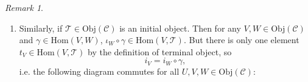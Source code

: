 \documentclass[11pt,openany]{book}
\theoremstyle{plain}
\theoremstyle{definition}
\theoremstyle{remark}
\newtheorem{remark}[remark]{Remark}
\begin{document}
\begin{remark}
\begin{enumerate}
    \item Similarly, if $\mathcal{T} \in \mathrm{Obj}(\mathcal{C})$ is an initial object. Then for any $V, W \in \mathrm{Obj}(\mathcal{C})$ and $\gamma \in \mathrm{Hom}(V,W)$, $\iota_W \circ \gamma \in \mathrm{Hom}(V,\mathcal{T})$. But there is only one element $t_V \in \mathrm{Hom}(V,\mathcal{T})$ by the definition of terminal object, so
    $$i_V = i_W \circ \gamma,$$
    i.e. the following diagram commutes for all $U, V, W \in \mathrm{Obj}(\mathcal{C})$:
\begin{center}
\end{center}
\end{enumerate}
\end{remark}
\end{document}
